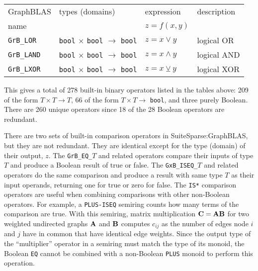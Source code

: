 \documentclass[12pt]{article}
\begin{document}
\vspace{0.2in}
{\footnotesize
\begin{tabular}{llll}
\hline
GraphBLAS             & types (domains)            & expression      & description \\
name                  &                            & $z=f(x,y)$      & \\
\hline
\verb'GrB_LOR'        & \verb'bool'
                        $\times$ \verb'bool'
                        $\rightarrow$ \verb'bool'  & $z = x \vee    y $ & logical OR \\
\verb'GrB_LAND'       & \verb'bool'
                        $\times$ \verb'bool'
                        $\rightarrow$ \verb'bool'  & $z = x \wedge  y $ & logical AND \\
\verb'GrB_LXOR'       & \verb'bool'
                        $\times$ \verb'bool'
                        $\rightarrow$ \verb'bool'  & $z = x \veebar y $ & logical XOR \\
\hline
\end{tabular}
}
\vspace{0.2in}

This gives a total of 278 built-in binary operators listed in the tables above:
209 of the form $T \times T \rightarrow T$, 66 of the form $T \times T
\rightarrow $ \verb'bool', and three purely Boolean.  There are 260 unique
operators since 18 of the 28 Boolean operators are redundant.

There are two sets of built-in comparison operators in SuiteSparse:Graph\-BLAS,
but they are not redundant.  They are identical except for the type (domain) of
their output, $z$.  The \verb'GrB_EQ_'$T$ and related operators compare their
inputs of type $T$ and produce a Boolean result of true or false.  The
\verb'GxB_ISEQ_'$T$ and related operators do the same comparison and produce a
result with same type $T$ as their input operands, returning one for true or
zero for false.  The \verb'IS*' comparison operators are useful when combining
comparisons with other non-Boolean operators.  For example, a \verb'PLUS-ISEQ'
semiring counts how many terms of the comparison are true.  With this semiring,
matrix multiplication ${\bf C=AB}$ for two weighted undirected graphs ${\bf A}$
and ${\bf B}$ computes $c_{ij}$ as the number of edges node $i$ and $j$ have in
common that have identical edge weights.  Since the output type of the
``multiplier'' operator in a semiring must match the type of its monoid, the
Boolean \verb'EQ' cannot be combined with a non-Boolean \verb'PLUS' monoid to
perform this operation.
\end{document}
